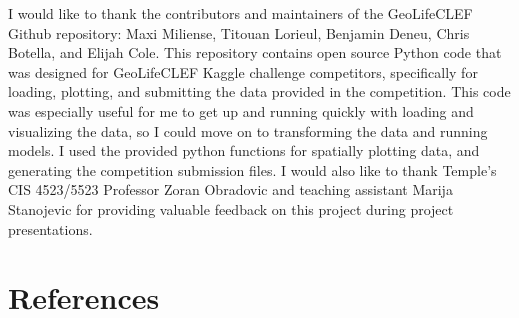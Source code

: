 \documentclass[12pt, oneside]{article}
\begin{document}
\begin{normalsize}

I would like to thank the contributors and maintainers of the GeoLifeCLEF Github repository: Maxi Miliense, Titouan Lorieul, Benjamin Deneu, Chris Botella, and Elijah Cole. This repository contains open source Python code that was designed for GeoLifeCLEF Kaggle challenge competitors, specifically for loading, plotting, and submitting the data provided in the competition. This code was especially useful for me to get up and running quickly with loading and visualizing the data, so I could move on to transforming the data and running models. I used the provided python functions for spatially plotting data, and generating the competition submission files. I would also like to thank Temple's CIS 4523/5523 Professor Zoran Obradovic and teaching assistant Marija Stanojevic for providing valuable feedback on this project during project presentations.

\end{normalsize}

\section{References}
\label{References}
\nocite{*}
\printbibliography[heading=none]
\end{document}
